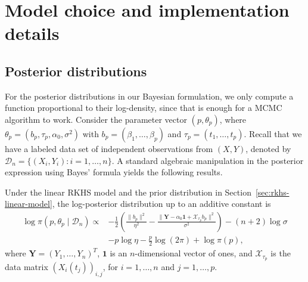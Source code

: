 %
%



\section{Model choice and implementation details}\label{app:model-choice}

\subsection{Posterior distributions}\label{app:posterior}

For the posterior distributions in our Bayesian formulation, we only compute a function proportional to their log-density, since that is enough for a MCMC algorithm to work. Consider the parameter vector \((p, \theta_p)\), where \(\theta_p=(b_p, \tau_p, \alpha_0, \sigma^2)\) with \(b_p=(\beta_1, \dots, \beta_p)\) and \(\tau_p = (t_1,\dots, t_p)\). Recall that we have a labeled data set of independent observations from \((X, Y)\), denoted by \(\mathcal D_n =\{(X_i, Y_i): i=1,\dots, n\}\). A standard algebraic manipulation in the posterior expression using Bayes' formula yields the following results.

\begin{proposition} Under the linear RKHS model and the prior distribution in Section~\ref{sec:rkhs-linear-model}, the log-posterior distribution up to an additive constant is
  \begin{align*}
  \log\pi(p, \theta_p\mid \mathcal D_n) \propto {} & -\frac{1}{2}\left(\frac{\|b_p\|^2}{\eta^2} - \frac{\|\bm{Y} - \alpha_0\bm{1} + \mathcal X_{\tau_p} b_p\|^2}{\sigma^2} \right) - (n+2)\log \sigma\\
   &- p\log \eta - \frac{p}{2}\log(2\pi) + \log \pi(p),
  \end{align*}
  where \(\bm Y=(Y_1,\dots,Y_n)^T\), \(\bm{1}\) is an \(n\)-dimensional vector of ones, and \(\mathcal X_{\tau_p}\) is the data matrix \((X_i(t_j))_{i,j}\), for \(i=1,\dots,n\) and \(j=1,\dots,p\).
\end{proposition}

